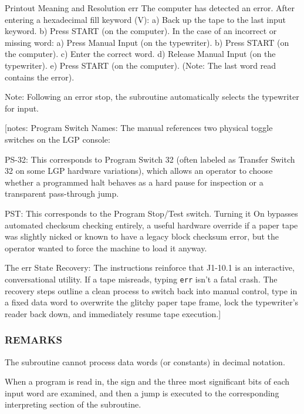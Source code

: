 \documentclass{article}
\begin{document}
\begin{enumerate}
Printout    Meaning and Resolution
err         The computer has detected an error.
            After entering a hexadecimal fill keyword (V):
                a) Back up the tape to the last input keyword.
                b) Press \textsf{START} (on the computer).
            In the case of an incorrect or missing word:
                a) Press \textsf{Manual Input} (on the typewriter).
                b) Press \textsf{START} (on the computer).
                c) Enter the correct word.
                d) Release \textsf{Manual Input} (on the typewriter).
                e) Press \textsf{START} (on the computer). (Note: The last word read contains the error).

Note: Following an error stop, the subroutine automatically selects the typewriter for input.

[notes: Program Switch Names: The manual references two physical toggle switches on the LGP console:

PS-32: This corresponds to Program Switch 32 (often labeled as Transfer Switch 32 on some LGP hardware variations), which allows an operator to choose whether a programmed halt behaves as a hard pause for inspection or a transparent pass-through jump.

PST: This corresponds to the Program Stop/Test switch. Turning it On bypasses automated checksum checking entirely, a useful hardware override if a paper tape was slightly nicked or known to have a legacy block checksum error, but the operator wanted to force the machine to load it anyway.

The err State Recovery: The instructions reinforce that J1-10.1 is an interactive, conversational utility. If a tape misreads, typing \texttt{err} isn't a fatal crash. The recovery steps outline a clean process to switch back into manual control, type in a fixed data word to overwrite the glitchy paper tape frame, lock the typewriter's reader back down, and immediately resume tape execution.]

\subsubsection*{REMARKS}
The subroutine cannot process data words (or constants) in decimal notation.

When a program is read in, the sign and the three most significant bits of each input word are examined, and then a jump is executed to the corresponding interpreting section of the subroutine.


\end{enumerate}
\end{document}

